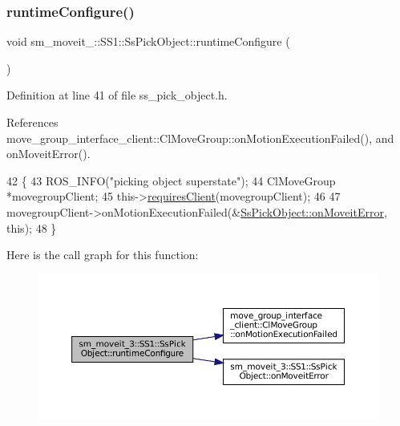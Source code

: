 \subsubsection{\texorpdfstring{runtime\+Configure()}{runtimeConfigure()}}
{\footnotesize\ttfamily void sm\+\_\+moveit\+\_\+::\+S\+S1\+::\+Ss\+Pick\+Object\+::runtime\+Configure (\begin{DoxyParamCaption}{ }\end{DoxyParamCaption})\hspace{0.3cm}{\ttfamily [inline]}}



Definition at line 41 of file ss\+\_\+pick\+\_\+object.\+h.



References move\+\_\+group\+\_\+interface\+\_\+client\+::\+Cl\+Move\+Group\+::on\+Motion\+Execution\+Failed(), and on\+Moveit\+Error().


\begin{DoxyCode}
42     \{
43         ROS\_INFO(\textcolor{stringliteral}{"picking object superstate"});
44         ClMoveGroup *movegroupClient;
45         this->\hyperlink{classsmacc_1_1ISmaccState_a7f95c9f0a6ea2d6f18d1aec0519de4ac}{requiresClient}(movegroupClient);
46 
47         movegroupClient->onMotionExecutionFailed(&\hyperlink{structsm__moveit__3_1_1SS1_1_1SsPickObject_ab2cf544834abb6a7b9032f58c228c12c}{SsPickObject::onMoveitError}, \textcolor{keyword}{
      this});
48     \}
\end{DoxyCode}
Here is the call graph for this function\+:
\nopagebreak
\begin{figure}[H]
\begin{center}
\leavevmode
\includegraphics[width=350pt]{structsm__moveit__3_1_1SS1_1_1SsPickObject_ab6c69d020a7630c4b8a81fc4241a33f0_cgraph}
\end{center}
\end{figure}
\mbox{\label{structsm__moveit__3_1_1SS1_1_1SsPickObject_a877486cbf581fdc5f1383191e0aa67bc}} 

